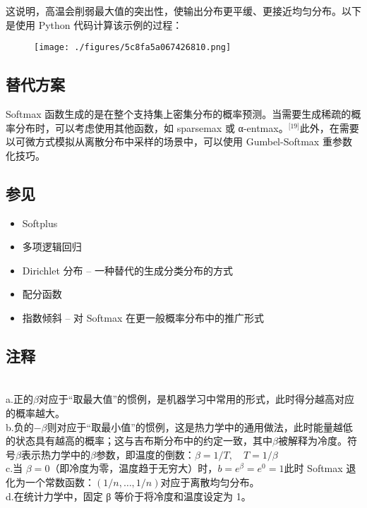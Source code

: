 这说明，高温会削弱最大值的突出性，使输出分布更平缓、更接近均匀分布。以下是使用 Python 代码计算该示例的过程：
\begin{figure}[ht]
\centering
\texttt{[image: ./figures/5c8fa5a067426810.png]}
\caption{} \label{fig_SoHs_1}
\end{figure}
\subsection{替代方案}
Softmax 函数生成的是在整个支持集上密集分布的概率预测。当需要生成稀疏的概率分布时，可以考虑使用其他函数，如 sparsemax 或 α-entmax。\(^\text{[19]}\)此外，在需要以可微方式模拟从离散分布中采样的场景中，可以使用 Gumbel-Softmax 重参数化技巧。
\subsection{参见}
\begin{itemize}
\item Softplus
\item 多项逻辑回归
\item Dirichlet 分布 – 一种替代的生成分类分布的方式
\item 配分函数
\item 指数倾斜 – 对 Softmax 在更一般概率分布中的推广形式
\end{itemize}
\subsection{注释}\\
a.正的$\beta$对应于“取最大值”的惯例，是机器学习中常用的形式，此时得分越高对应的概率越大。\\
b.负的$-\beta$则对应于“取最小值”的惯例，这是热力学中的通用做法，此时能量越低的状态具有越高的概率；这与吉布斯分布中的约定一致，其中$\beta$被解释为冷度。符号$\beta$表示热力学中的$\beta$参数，即温度的倒数：$\beta = 1/T, \quad T = 1/\beta$\\
c.当 $\beta = 0$（即冷度为零，温度趋于无穷大）时，$b = e^{\beta} = e^0 = 1$此时 Softmax 退化为一个常数函数：$(1/n, \dots, 1/n)$对应于离散均匀分布。\\
d.在统计力学中，固定 β 等价于将冷度和温度设定为 1。
